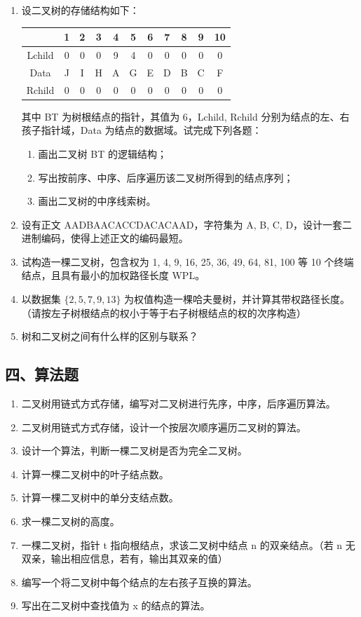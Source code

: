\documentclass[12pt, a4paper]{article}
\begin{document}
\begin{enumerate}
    \item 设二叉树的存储结构如下：
    \begin{center}
    \begin{tabular}{|c|c|c|c|c|c|c|c|c|c|c|}
    \hline
     & 1 & 2 & 3 & 4 & 5 & 6 & 7 & 8 & 9 & 10 \\ \hline
    Lchild & 0 & 0 & 0 & 9 & 4 & 0 & 0 & 0 & 0 & 0 \\ \hline
    Data & J & I & H & A & G & E & D & B & C & F \\ \hline
    Rchild & 0 & 0 & 0 & 0 & 0 & 0 & 0 & 0 & 0 & 0 \\ \hline
    \end{tabular}
    \end{center}
    其中 BT 为树根结点的指针，其值为 6，Lchild, Rchild 分别为结点的左、右孩子指针域，Data 为结点的数据域。试完成下列各题：
    \begin{enumerate}
        \item 画出二叉树 BT 的逻辑结构；
        \item 写出按前序、中序、后序遍历该二叉树所得到的结点序列；
        \item 画出二叉树的中序线索树。
    \end{enumerate}
    
    \item 设有正文 AADBAACACCDACACAAD，字符集为 A, B, C, D，设计一套二进制编码，使得上述正文的编码最短。
    
    \item 试构造一棵二叉树，包含权为 1, 4, 9, 16, 25, 36, 49, 64, 81, 100 等 10 个终端结点，且具有最小的加权路径长度 WPL。
    
    \item 以数据集 $\{2, 5, 7, 9, 13\}$ 为权值构造一棵哈夫曼树，并计算其带权路径长度。（请按左子树根结点的权小于等于右子树根结点的权的次序构造）
    
    \item 树和二叉树之间有什么样的区别与联系？
\end{enumerate}

\subsection*{四、算法题}
\begin{enumerate}
    \item 二叉树用链式方式存储，编写对二叉树进行先序，中序，后序遍历算法。
    \item 二叉树用链式方式存储，设计一个按层次顺序遍历二叉树的算法。
    \item 设计一个算法，判断一棵二叉树是否为完全二叉树。
    \item 计算一棵二叉树中的叶子结点数。
    \item 计算一棵二叉树中的单分支结点数。
    \item 求一棵二叉树的高度。
    \item 一棵二叉树，指针 t 指向根结点，求该二叉树中结点 n 的双亲结点。（若 n 无双亲，输出相应信息，若有，输出其双亲的值）
    \item 编写一个将二叉树中每个结点的左右孩子互换的算法。
    \item 写出在二叉树中查找值为 x 的结点的算法。
\end{enumerate}
\end{document}
